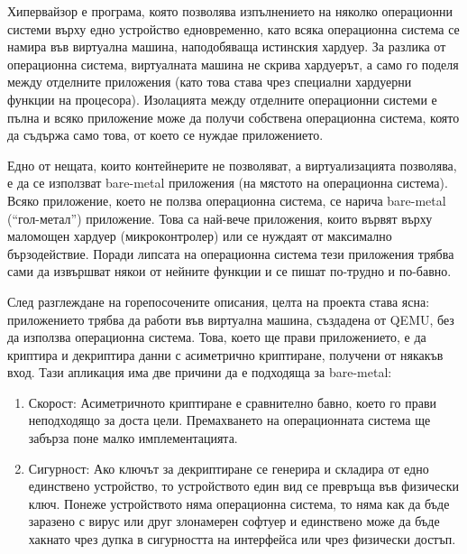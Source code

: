 Хипервайзор е програма, която позволява изпълнението на няколко операционни системи върху едно устройство едновременно, като всяка операционна система се намира във виртуална машина, наподобяваща истинския хардуер. За разлика от операционна система, виртуалната машина не скрива хардуерът, а само го поделя между отделните приложения (като това става чрез специални хардуерни функции на процесора). Изолацията между отделните операционни системи е пълна и всяко приложение може да получи собствена операционна система, която да съдържа само това, от което се нуждае приложението.

Едно от нещата, които контейнерите не позволяват, а виртуализацията позволява, е да се използват bare-metal приложения (на мястото на операционна система).
Всяко приложение, което не ползва операционна система, се нарича bare-metal (``гол-метал'') приложение. Това са най-вече приложения, които вървят върху маломощен хардуер (микроконтролер) или се нуждаят от максимално бързодействие. Поради липсата на операционна система тези приложения трябва сами да извършват някои от нейните функции и се пишат по-трудно и по-бавно.


След разглеждане на горепосочените описания, целта на проекта става ясна: приложението трябва да работи във виртуална машина, създадена от QEMU, без да използва операционна система. Това, което ще прави приложението, е да криптира и декриптира данни с асиметрично криптиране, получени от някакъв вход. Тази апликация има две причини да е подходяща за bare-metal:
\begin{enumerate}
  \item Скорост: Асиметричното криптиране е сравнително бавно, което го прави неподходящо за доста цели. Премахването на операционната система ще забърза поне малко имплементацията.
  \item Сигурност: Ако ключът за декриптиране се генерира и складира от едно единствено устройство, то устройството един вид се превръща във физически ключ. Понеже устройството няма операционна система, то няма как да бъде заразено с вирус или друг злонамерен софтуер и единствено може да бъде хакнато чрез дупка в сигурността на интерфейса или чрез физически достъп.
\end{enumerate}


